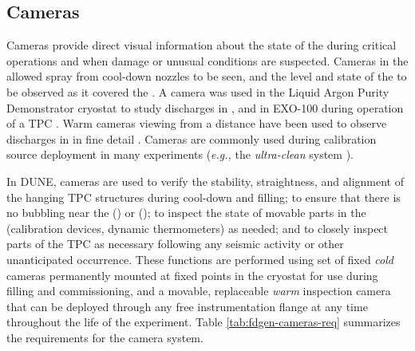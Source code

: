 \subsection{Cameras}
\label{sec:fdgen-slow-cryo-cameras}

Cameras provide direct visual information about the state of the
 during critical operations and when damage or unusual
conditions are suspected.  Cameras in the  allowed spray from cool-down
nozzles to be seen, and the level and state of the \lar to be
observed as it covered the  \cite{Murphy:20170516}.  A camera was
used in the Liquid Argon Purity Demonstrator
cryostat\cite{Adamowski:2014daa} to study  discharges in
\lar, and in EXO-100 during operation of a TPC
\cite{Delaquis:2013hva}.  Warm cameras viewing \lar from a distance
have been used to observe  discharges in \lar in
fine detail \cite{Auger:2015xlo}.  Cameras are commonly used during
calibration source deployment in many experiments ({\em e.g.,} the
\kamland \textit{ultra-clean} system \cite{Banks:2014hra}).

In DUNE, cameras are used to verify the stability, straightness,
and alignment of the hanging TPC structures during cool-down and
filling; to ensure that there is no bubbling near the 
(\single) or  (\dual); to inspect the
state of movable parts in the  (calibration devices, dynamic
thermometers) as needed; and to closely inspect parts of the TPC as
necessary following any seismic activity or other unanticipated
occurrence.  These functions are performed using set of fixed
\textit{cold} cameras permanently mounted at fixed points in the cryostat
for use during filling and commissioning, and a movable, replaceable
\textit{warm} inspection camera that can be deployed through any free
instrumentation flange at any time throughout the life of the
experiment.  Table \ref{tab:fdgen-cameras-req} summarizes the
requirements for the camera system.

